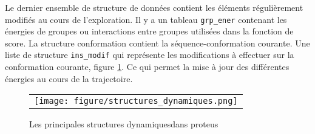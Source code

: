 Le dernier ensemble de structure de données contient les éléments régulièrement modifiés au cours de l'exploration.
Il y a un tableau  \verb!grp_ener! contenant les énergies de groupes ou interactions entre groupes utilisées dans la fonction de score. La structure conformation contient la séquence-conformation courante. Une liste de structure \verb!ins_modif! qui représente les modifications à effectuer sur la conformation courante, figure \ref{fig:structDyna}. Ce qui permet la mise à jour des différentes énergies au cours de la trajectoire.   

   \begin{figure}[!htbp]
     \centering
     \begin{tabular}{c}
       \texttt{[image: figure/structures\_dynamiques.png]} 
     \end{tabular}
     
     \caption{Les principales structures \og dynamiques\fg dans proteus}
\label{fig:structDyna}
   \end{figure}




